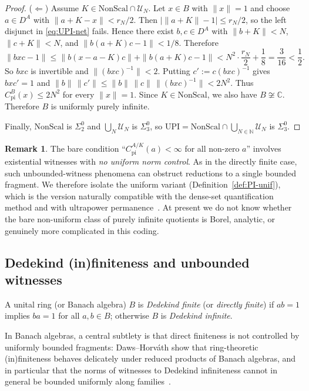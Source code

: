\documentclass[12pt,fleqn,a4paper]{amsart}
\renewcommand{\le}{\leqslant}
\numberwithin{equation}{section}
\theoremstyle{definition}
\newtheorem{remark}[theorem]{Remark}
\newcommand{\N}{\mathbb{N}}
\newcommand{\C}{\mathbb{C}}
\begin{document}
\begin{proof}
\smallskip\noindent
($\Leftarrow$)
Assume $K\in\mathrm{NonScal}\cap\mathcal U_N$.
Let $x\in B$ with $\|x\|=1$ and choose $a\in D^A$ with
$\|a+K-x\|<r_N/2$.
Then $|\|a+K\|-1|\le r_N/2$, so the left disjunct in \eqref{eq:UPI-net} fails.
Hence there exist $b,c\in D^A$ with
$\|b+K\|<N$, $\|c+K\|<N$, and $\|b(a+K)c-1\|<1/8$.
Therefore
\[
\|bxc-1\|
\le \|b(x-a-K)c\|+\|b(a+K)c-1\|
< N^2\cdot\frac{r_N}{2}+\frac18
=\frac{3}{16}
<\frac12.
\]
So $bxc$ is invertible and $\|(bxc)^{-1}\|<2$.
Putting $c':=c(bxc)^{-1}$ gives $bxc'=1$ and
$\|b\|\,\|c'\|\le \|b\|\,\|c\|\,\|(bxc)^{-1}\|< 2N^2$.
Thus $C_{\mathrm{pi}}^B(x)\le 2N^2$ for every $\|x\|=1$.
Since $K\in\mathrm{NonScal}$, we also have $B\not\cong\C$.
Therefore $B$ is uniformly purely infinite.

\medskip\noindent
Finally, $\mathrm{NonScal}$ is $\Sigma^0_2$ and $\bigcup_N\mathcal U_N$ is
$\Sigma^0_3$, so
$\mathrm{UPI}=\mathrm{NonScal}\cap\bigcup_{N\in\N}\mathcal U_N$
is $\Sigma^0_3$.
\end{proof}

\begin{remark}\label{rem:PI-nonuniform}
The bare condition ``$C_{\mathrm{pi}}^{A/K}(a)<\infty$ for all non-zero $a$'' involves
existential witnesses with \emph{no uniform norm control}.  As in the directly finite
case, such unbounded-witness phenomena can
obstruct reductions to a single bounded fragment.  We therefore isolate the uniform
variant (Definition~\ref{def:PI-unif}), which is the version naturally compatible with
the dense-set quantification method and with ultrapower permanence~\cite{DawsHorvath}.
At present we do not know whether the bare non-uniform class of purely infinite quotients
is Borel, analytic, or genuinely more complicated in this coding.
\end{remark}

\subsection{Dedekind (in)finiteness and unbounded witnesses}\label{subsec:df-banach}

A unital ring (or Banach algebra) $B$ is \emph{Dedekind finite} (or \emph{directly
finite}) if $ab=1$ implies $ba=1$ for all $a,b\in B$; otherwise $B$ is
\emph{Dedekind infinite}.

In Banach algebras, a central subtlety is that direct finiteness is not controlled by
uniformly bounded fragments: Daws--Horv\'ath show that ring-theoretic (in)finiteness
behaves delicately under reduced products of Banach algebras, and in particular that
the norms of witnesses to Dedekind infiniteness cannot in general be bounded uniformly
along families~\cite{DawsHorvathCJM}.
\end{document}
